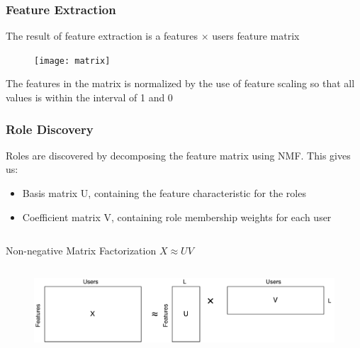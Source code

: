 \begin{frame}
\frametitle{Feature Extraction}

The result of feature extraction is a features $\times$ users feature matrix

\begin{figure}
	\texttt{[image: matrix]}
\end{figure}

The features in the matrix is normalized by the use of feature scaling so that all values is within the interval of 1 and 0

\end{frame}

\begin{frame}
\frametitle{Role Discovery}
Roles are discovered by decomposing the feature matrix using NMF. This gives us:
\begin{itemize}
\item Basis matrix U, containing the feature characteristic for the roles
\item Coefficient matrix V, containing role membership weights for each user
\end{itemize}
\begin{columns}\centering
	\begin{column}{0.5\textwidth}
		\begin{block}{\small Non-negative Matrix Factorization}\centering
			$X \approx UV$
		\end{block}
		\end{column}
\end{columns}
\begin{figure}
\includegraphics[scale=.3]{graphics/nmf}
\end{figure}

\end{frame}

